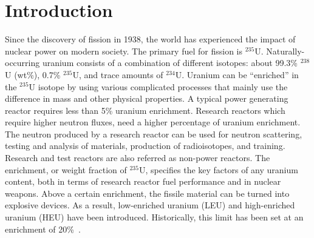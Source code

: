 \chapter{Introduction}
Since the discovery of fission in 1938, the world has experienced the impact of nuclear power on modern society. The primary fuel for fission is $^{235}$U\@. Naturally-occurring uranium consists of a combination of different isotopes: about 99.3\% $^{238}$U (wt\%),  0.7\% $^{235}$U, and trace amounts of $^{234}$U\@. Uranium can be ``enriched'' in the $^{235}$U isotope by using various complicated processes that mainly use the difference in mass and other physical properties. A typical power generating reactor requires less than 5\% uranium enrichment. Research reactors which require higher neutron fluxes, need a higher percentage of uranium enrichment. The neutron produced by a research reactor can be used for neutron scattering, testing and analysis of materials, production of radioisotopes, and training. Research and test reactors are also referred as non-power reactors.
The enrichment, or weight fraction of $^{235}$U, specifies the key factors of any uranium content, both in terms of research reactor fuel performance and in nuclear weapons. Above a certain enrichment, the fissile material can be turned into explosive devices. As a result, low-enriched uranium (LEU) and high-enriched uranium (HEU) have been introduced. Historically, this limit has been set at an enrichment of 20\%~\cite{glaser2005enrichment, international2005iaea}.

